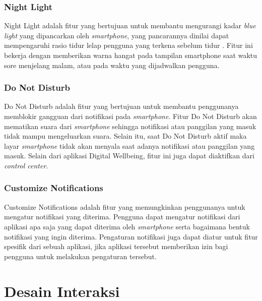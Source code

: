 \subsubsection{Night Light}
Night Light adalah fitur yang bertujuan untuk membantu mengurangi kadar \textit{blue light} yang dipancarkan oleh \textit{smartphone}, yang pancarannya dinilai dapat mempengaruhi rasio tidur lelap pengguna yang terkena sebelum tidur \parencite{ISHIZAWA2021303}. Fitur ini bekerja dengan memberikan warna hangat pada tampilan smartphone saat waktu sore menjelang malam, atau pada waktu yang dijadwalkan pengguna. \parencite{android2019digitalwellbeing}

\subsubsection{Do Not Disturb}
Do Not Disturb adalah fitur yang bertujuan untuk membantu penggunanya memblokir gangguan dari notifikasi pada \textit{smartphone}. Fitur Do Not Disturb akan mematikan suara dari \textit{smartphone} sehingga notifikasi atau panggilan yang masuk tidak mampu mengeluarkan suara. Selain itu, saat Do Not Disturb aktif maka layar \textit{smartphone} tidak akan menyala saat adanya notifikasi atau panggilan yang masuk. \parencite{android2019digitalwellbeing} Selain dari aplikasi Digital Wellbeing, fitur ini juga dapat diaktifkan dari \textit{control center}.

\subsubsection{Customize Notifications}
Customize Notifications adalah fitur yang memungkinkan penggunanya untuk mengatur notifikasi yang diterima. Pengguna dapat mengatur notifikasi dari aplikasi apa saja yang dapat diterima oleh \textit{smartphone} serta bagaimana bentuk notifikasi yang ingin diterima. Pengaturan notifikasi juga dapat diatur untuk fitur spesifik dari sebuah aplikasi, jika aplikasi tersebut memberikan izin bagi pengguna untuk melakukan pengaturan tersebut. 


\section{Desain Interaksi}

